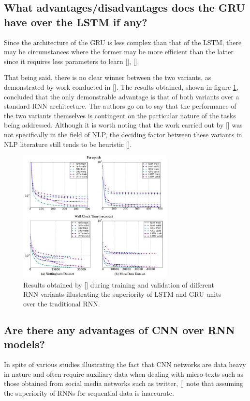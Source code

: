 \documentclass[12pt, a4paper]{report}
\theoremstyle{definition}
\theoremstyle{definition}%
\theoremstyle{definition}%
\theoremstyle{definition}%
\theoremstyle{definition}%
\theoremstyle{definition}%
\renewcommand{\cite}[1]{[\citealp{#1}]}
\begin{document}
\subsection{What advantages/disadvantages does the GRU have over the LSTM if any?}
Since the architecture of the GRU is less complex than that of the LSTM, there may be circumstances where the former may be more efficient than the latter since it requires less parameters to learn \cite{chen2017}, \cite{jabreel2017}.

That being said, there is no clear winner between the two variants, as demonstrated by work conducted in \cite{chung2014}. The results obtained, shown in figure \ref{fig:rnn_v_lstm_v_gru_graphs}, concluded that the only demonstrable advantage is that of both variants over a standard RNN architecture. The authors go on to say that the performance of the two variants themselves is contingent on the particular nature of the tasks being addressed. Although it is worth noting that the work carried out by \cite{chung2014} was not specifically in the field of NLP, the deciding factor between these variants in NLP literature still tends to be heuristic \cite{young2017}.

\begin{figure}[!ht]
	\centering
	\includegraphics[width=0.7\textwidth]{./figures/rnn_v_lstm_v_gru_graphs.jpg}
	\caption{Results obtained by \cite{chung2014} during training and validation of different RNN variants illustrating the superiority of LSTM and GRU units over the traditional RNN.}
	\label{fig:rnn_v_lstm_v_gru_graphs}
\end{figure}

\subsection{Are there any advantages of CNN over RNN models?}
In spite of various studies illustrating the fact that CNN networks are data heavy in nature and often require auxiliary data when dealing with micro-texts such as those obtained from social media networks such as twitter, \cite{young2017} note that assuming the superiority of RNNs for sequential data is inaccurate.
\end{document}
